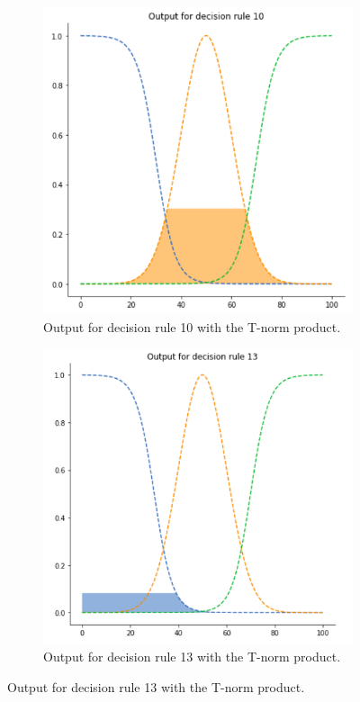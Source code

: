 \begin{figure}[ht]
\begin{subfigure}{.5\textwidth}
  \centering
  \includegraphics[width=.8\linewidth]{figures/second/prod1.png}  
  \caption{Output for decision rule 10 with the T-norm product.}
  \label{fig:2prod1}
\end{subfigure}
\begin{subfigure}{.5\textwidth}
  \centering
  \includegraphics[width=.8\linewidth]{figures/second/prod2.png}  
  \caption{Output for decision rule 13 with the T-norm product.}
  \label{fig:2prod2}
\end{subfigure}

\end{figure}
